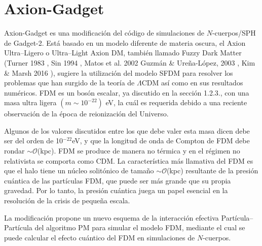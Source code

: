 \documentclass[a4paper,openright,12pt]{book}
\begin{document}
\section{Axion-Gadget}
Axion-Gadget \cite{3.1} es una modificación del código de simulaciones de $N$-cuerpos/SPH de Gadget-2. Está basado en un modelo diferente de materia oscura, el Axion Ultra--Ligero o Ultra--Light Axion DM, también llamado Fuzzy Dark Matter (Turner 1983 \cite{3.1.1}, Sin 1994 \cite{3.1.2}, Matos et al. 2002 \cite{3.1.3} Guzmán \& Ureña-López, 2003 \cite{3.1.4}, Kim \& Marsh 2016 \cite{3.1.5}), sugiere la utilización del modelo SFDM para resolver los problemas que han surgido de la teoría de $\Lambda$CDM así como en sus resultados numéricos. FDM es un bosón escalar, ya discutido en la sección 1.2.3., con una masa ultra ligera $(m \sim 10^{-22})$ eV, la cuál es requerida debido a una reciente observación de la época de reionización del Universo. 

Algunos de los valores discutidos entre los que debe valer esta masa dicen debe ser del orden de 10$^{-22}$eV, y que la longitud de onda de Compton de FDM debe rondar $\sim \mathcal{O}$(kpc). FDM se produce de manera no térmica y en el régimen no relativista se comporta como CDM. La característica más llamativa del FDM es que el halo tiene un núcleo solitónico de tamaño $\sim \mathcal{O} $(kpc) resultante de la presión cuántica de las partículas FDM, que puede ser más grande que su propia gravedad. Por lo tanto, la presión cuántica juega un papel esencial en la resolución de la crisis de pequeña escala. 

La modificación propone un nuevo esquema de la interacción efectiva Partícula--Partícula del algoritmo PM para simular el modelo FDM, mediante el cual se puede calcular el efecto cuántico del FDM en simulaciones de $N$-cuerpos.
\end{document}
